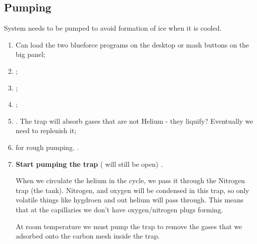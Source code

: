 \subsection{Pumping}
System  needs to  be pumped  to  avoid formation  of ice  when it  is
cooled.
\begin{enumerate}
\item Can  load the  two blueforce  programs on  the desktop  or mash
  buttons on the big panel;
\item {};
\item {};
\item {};
\item {}.  The trap will
  absorb gases  that are  not Helium -  they liquify?   Eventually we
  need to replenish it;
\item {} for rough
  pumping. .
\item \textbf{Start pumping the  trap}   (  will  still be  open)  \ira
  .

  When we circulate  the helium in the cycle, we  pass it through the
  Nitrogen trap (the  tank).  Nitrogen, and oxygen  will be condensed
  in this trap, so only volatile  things like hygdroen and out helium
  will pass through. This means that at the capillaries we don't have
  oxygen/nitrogen plugs forming.

  At room temperature we must pump  the trap to remove the gases that
  we adsorbed onto the carbon mesh inside the trap.

  \begin{framed}\noindent
  \end{framed}


\end{enumerate}
